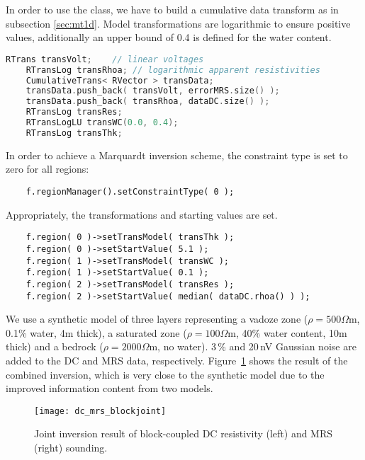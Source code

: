 In order to use the class, we have to build a cumulative data transform as in subsection \ref{sec:mt1d}.
Model transformations are logarithmic to ensure positive values, additionally an upper bound of 0.4 is defined for the water content.
\begin{lstlisting}[language=C++,morekeywords={RVector,RMatrix}]
    RTrans transVolt;    // linear voltages
    RTransLog transRhoa; // logarithmic apparent resistivities
    CumulativeTrans< RVector > transData;
    transData.push_back( transVolt, errorMRS.size() );
    transData.push_back( transRhoa, dataDC.size() );
    RTransLog transRes;
    RTransLogLU transWC(0.0, 0.4);
    RTransLog transThk;
\end{lstlisting}

In order to achieve a Marquardt inversion scheme, the constraint type is set to zero for all regions:
\begin{lstlisting}
    f.regionManager().setConstraintType( 0 );
\end{lstlisting}
Appropriately, the transformations and starting values are set.
\begin{lstlisting}
    f.region( 0 )->setTransModel( transThk );
    f.region( 0 )->setStartValue( 5.1 );
    f.region( 1 )->setTransModel( transWC );
    f.region( 1 )->setStartValue( 0.1 );
    f.region( 2 )->setTransModel( transRes );
    f.region( 2 )->setStartValue( median( dataDC.rhoa() ) );
\end{lstlisting}

We use a synthetic model of three layers representing a vadoze zone ($\rho=500\Omega$m, 0.1\% water, 4m thick), a saturated zone ($\rho=100\Omega$m, 40\% water content, 10m thick) and a bedrock ($\rho=2000\Omega$m, no water).
3\,\% and 20\,nV Gaussian noise are added to the DC and MRS data, respectively.
Figure~\ref{fig:blockjoint} shows the result of the combined inversion, which is very close to the synthetic model due to the improved information content from two models.

\begin{figure}[htb]
\centering\texttt{[image: dc\_mrs\_blockjoint]}
\caption{Joint inversion result of block-coupled DC resistivity (left) and MRS (right) sounding.}\label{fig:blockjoint}
\end{figure}


